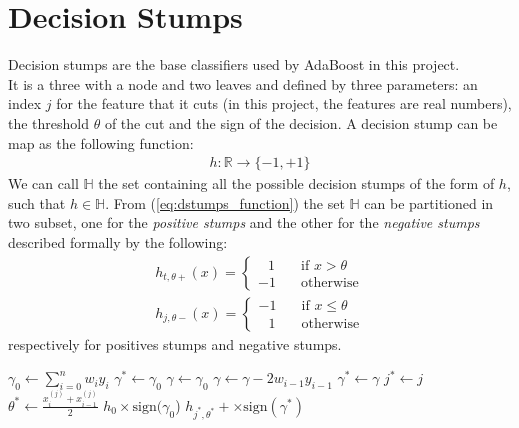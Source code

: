 \chapter{Decision Stumps}
Decision stumps are the base classifiers used by AdaBoost in this project.\\
It is a three with a node and two leaves and defined by three parameters: an index $j$ for the feature that it cuts (in this project, the features are real numbers), the threshold $\theta$ of the cut and the sign of the decision. A decision stump can be map as the following function:
\begin{align}
\label{eq:dstumps_function}
	h:\mathbb{R} \to \lbrace-1, +1\rbrace
\end{align}
We can call $\mathbb{H}$ the set containing all the possible decision stumps of the form of $h$, such that $h \in \mathbb{H}$. From (\ref{eq:dstumps_function}) the set $\mathbb{H}$ can be partitioned in two subset, one for the \textit{positive stumps} and the other for the \textit{negative stumps} described formally by the following:
\begin{align}
h_{t, \theta+}(x) =
\begin{cases}
\;\;\,1       & \quad \text{if } x > \theta\\
-1  & \quad \text{otherwise}
\end{cases}
\\
h_{j,\theta-}(x) =
\begin{cases}
-1			& \quad \text{if } x \leq \theta\\
\;\;\,1		& \quad \text{otherwise}
\end{cases}
\end{align}
respectively for positives stumps and negative stumps.
\begin{algorithm}[htpb]
	\caption{}
	\label{alg:dstumps}
	\begin{algorithmic}[1]
		\State $\gamma_{0} \gets \sum_{i=0}^{n}w_{i}y_{i}$
		\State $\gamma^{*} \gets \gamma_{0}$
			\State $\gamma \gets \gamma_{0}$
				\State $\gamma \gets \gamma - 2w_{i-1}y_{i-1}$
					\If{$|\gamma| > |\gamma^{*}|$}
						\State $\gamma^{*} \gets \gamma$
						\State $j^{*} \gets j$
						\State $\theta^{*} \gets \frac{x_{i}^{(j)} + x_{i-1}^{(j)}}{2}$
					\EndIf
				\EndIf
			\EndFor
		\EndFor
		\If{$\gamma^{*} = \gamma$}
			\Return $h_{0}\times\text{sign}(\gamma_{0}$)
		\Else
			\Return $h_{j^{*},\theta^{*}}+\times\text{sign}(\gamma^{*})$
		\EndIf
		\EndProcedure
	\end{algorithmic}
\end{algorithm}


